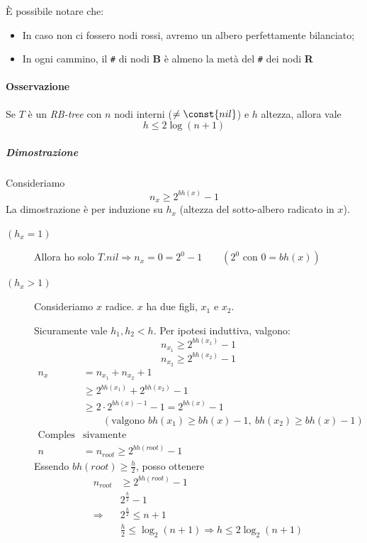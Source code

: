 È possibile notare che: 
\begin{itemize}
    \item In caso non ci fossero nodi rossi, avremo un albero
    perfettamente bilanciato;
    \item In ogni cammino, il \verb|#| di nodi \textbf{B} è almeno la
    metà del \verb|#| dei nodi \textbf{R}
\end{itemize}

\paragraph{Osservazione} Se $T$ è un \emph{RB-tree} con $n$ nodi interni ($\neq \const{nil}$)
e $h$ altezza, allora vale
$$h \leq 2 \log (n + 1)$$

\subparagraph{Dimostrazione} Consideriamo 
$$n_x \geq 2^{bh(x)} - 1$$
La dimostrazione è per induzione su $h_x$ (altezza del sotto-albero radicato in $x$).

\begin{description}
    \item[$(h_x = 1)$] Allora ho solo 
    $T.nil \Rightarrow n_x = 0 = 2^0 - 1 \qquad (2^0 \text{ con } 0 = bh(x))$
    \item[$(h_x > 1)$] Consideriamo $x$ radice. $x$ ha due figli, $x_1$ e $x_2$.\par
    Sicuramente vale $h_1,h_2 < h$. Per ipotesi induttiva, valgono:
    $$n_{x_1} \geq 2^{bh(x_1)} - 1$$
    $$n_{x_2} \geq 2^{bh(x_2)} - 1$$
    \begin{align*}
        n_x & = n_{x_1} + n_{x_2} + 1 \\
        & \geq 2^{bh(x_1)} + 2^{bh(x_2)} - 1 \\
        & \geq 2 \cdot 2^{bh(x)-1} - 1 = 2^{bh(x)} - 1 \\
        & \qquad (\text{valgono } bh(x_1) \geq bh(x)-1, \ bh(x_2) \geq bh(x)-1) \\
        \text{Comples}&\text{sivamente}\\
        n & = n_{root} \geq 2^{bh(root)} - 1
    \end{align*}
    Essendo $bh(root) \geq \frac{h}{2}$, posso ottenere
    \begin{align*}
        n_{root} & \geq 2^{bh(root)} - 1 \\
        & 2^{\frac{h}{2}} - 1 \\
        \Rightarrow \ & 2^{\frac{h}{2}} \leq n + 1 \\
        & \frac{h}{2} \leq \log_2(n+1) \Rightarrow h \leq 2 \log_2(n+1) 
    \end{align*}
\end{description}

